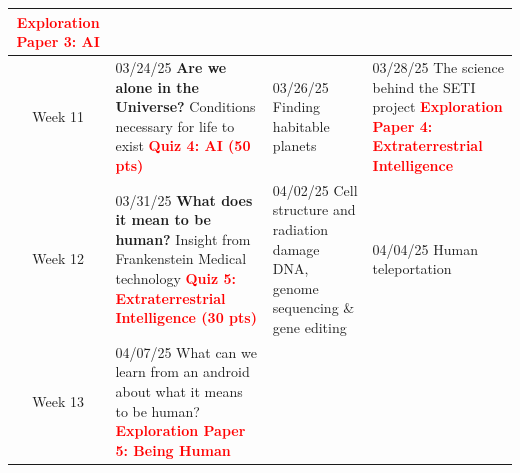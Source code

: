 \documentclass[11pt]{article}
\begin{document}
\begin{tabularx}{\textwidth}{|c|X|X|X|}
    \textcolor{red}{\textbf{Exploration Paper 3: AI}}\\

    \hline
    Week 11 & 
    
    03/24/25 \newline
    \textbf{Are we alone in the Universe?}\newline
    Conditions necessary for life to exist\newline
    \newline
    \textcolor{red}{\textbf{Quiz 4: AI (50 pts)}}&
    
    03/26/25 \newline
    \newline
    Finding habitable planets\newline
    \newline
    &

    03/28/25 \newline
    \newline
    \newline
    The science behind the SETI project\newline
    \textcolor{red}{\textbf{Exploration Paper 4: Extraterrestrial Intelligence}}\\

    \hline
    Week 12 & 
    
    03/31/25 \newline
    \textbf{What does it mean to be human?}\newline
    Insight from Frankenstein \newline
    Medical technology \newline
    \textcolor{red}{\textbf{Quiz 5: Extraterrestrial Intelligence (30 pts)}}&
    
    04/02/25 \newline
    \newline
    Cell structure and radiation damage \newline
    DNA, genome sequencing \& gene editing\newline
    &

    04/04/25 \newline
    \newline
    Human teleportation \newline
    \\
    
    \hline
    Week 13 & 

    04/07/25 \newline
    \newline
    What can we learn from an android \newline
    about what it means to be human?\newline
    \textcolor{red}{\textbf{Exploration Paper 5: Being Human}} &
    

\end{tabularx}
\end{document}
